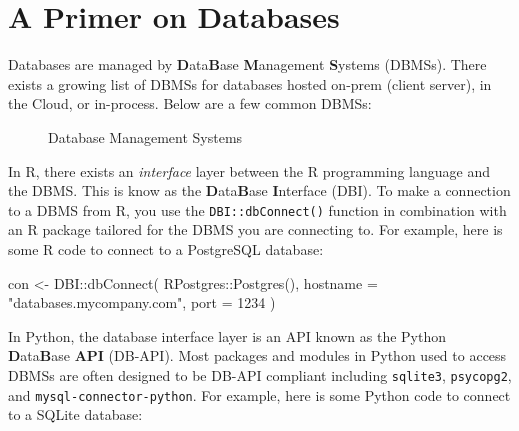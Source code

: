 \documentclass[
  letterpaper,
  DIV=11,
  numbers=noendperiod]{scrreprt}
\newenvironment{Shaded}{\begin{snugshade}}{\end{snugshade}}
\newcommand{\AttributeTok}[1]{\textcolor[rgb]{0.40,0.45,0.13}{#1}}
\newcommand{\DecValTok}[1]{\textcolor[rgb]{0.68,0.00,0.00}{#1}}
\newcommand{\FunctionTok}[1]{\textcolor[rgb]{0.28,0.35,0.67}{#1}}
\newcommand{\NormalTok}[1]{\textcolor[rgb]{0.00,0.23,0.31}{#1}}
\newcommand{\OtherTok}[1]{\textcolor[rgb]{0.00,0.23,0.31}{#1}}
\newcommand{\SpecialCharTok}[1]{\textcolor[rgb]{0.37,0.37,0.37}{#1}}
\newcommand{\StringTok}[1]{\textcolor[rgb]{0.13,0.47,0.30}{#1}}
\begin{document}
\section{A Primer on Databases}\label{a-primer-on-databases}

Databases are managed by \textbf{D}ata\textbf{B}ase \textbf{M}anagement
\textbf{S}ystems (DBMSs). There exists a growing list of DBMSs for
databases hosted on-prem (client server), in the Cloud, or in-process.
Below are a few common DBMSs:

\begin{figure}


\caption{\label{fig-dbms}Database Management Systems}

\end{figure}%

In R, there exists an \emph{interface} layer between the R programming
language and the DBMS. This is know as the \textbf{D}ata\textbf{B}ase
\textbf{I}nterface (DBI). To make a connection to a DBMS from R, you use
the \texttt{DBI::dbConnect()} function in combination with an R package
tailored for the DBMS you are connecting to. For example, here is some R
code to connect to a PostgreSQL database:

\begin{Shaded}
\begin{Highlighting}[]
\NormalTok{con }\OtherTok{\textless{}{-}}\NormalTok{ DBI}\SpecialCharTok{::}\FunctionTok{dbConnect}\NormalTok{(}
\NormalTok{  RPostgres}\SpecialCharTok{::}\FunctionTok{Postgres}\NormalTok{(), }
  \AttributeTok{hostname =} \StringTok{"databases.mycompany.com"}\NormalTok{, }
  \AttributeTok{port =} \DecValTok{1234}
\NormalTok{)}
\end{Highlighting}
\end{Shaded}

In Python, the database interface layer is an API known as the Python
\textbf{D}ata\textbf{B}ase \textbf{API} (DB-API). Most packages and
modules in Python used to access DBMSs are often designed to be DB-API
compliant including \texttt{sqlite3}, \texttt{psycopg2}, and
\texttt{mysql-connector-python}. For example, here is some Python code
to connect to a SQLite database:
\end{document}
